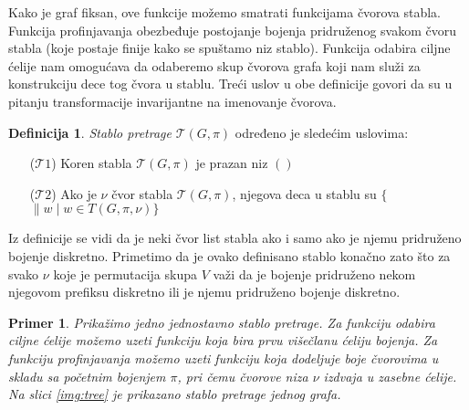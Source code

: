 \documentclass[12pt,oneside]{memoir}
\newtheorem{example}{Primer}
\theoremstyle{definition}
\newtheorem*{definition}{Definicija}
\begin{document}
  Kako je graf fiksan, ove funkcije možemo smatrati funkcijama čvorova stabla.
  Funkcija profinjavanja obezbeđuje postojanje bojenja pridruženog svakom čvoru
  stabla (koje postaje finije kako se spuštamo niz stablo). Funkcija odabira
  ciljne ćelije nam omogućava da odaberemo skup čvorova grafa koji nam služi za
  konstrukciju dece tog čvora u stablu. Treći uslov u obe definicije govori da
  su u pitanju transformacije invarijantne na imenovanje čvorova.

  \begin{definition}
      \emph{Stablo pretrage} $\mathcal{T}(G, \pi)$ određeno je sledećim uslovima:
  
   \begin{itemize}
       \item[($\mathcal{T}1$)] Koren stabla $\mathcal{T}(G, \pi)$ je prazan niz $()$
       \item[($\mathcal{T}2$)] Ako je $\nu$ čvor stabla $\mathcal{T}(G, \pi)$, njegova deca u
     	stablu su $\{$\nu$ \| w \mid w \in T(G, \pi, \nu)\}$
   \end{itemize}
  \end{definition}

  Iz definicije se vidi da je neki čvor list stabla ako i samo ako je njemu
  pridruženo bojenje diskretno. Primetimo da je ovako definisano stablo konačno
  zato što za svako $\nu$ koje je permutacija skupa $V$ važi da je bojenje
  pridruženo nekom njegovom prefiksu diskretno ili je njemu pridruženo bojenje
  diskretno.

  \begin{example}
	  Prikažimo jedno jednostavno stablo pretrage. Za funkciju odabira ciljne
	  ćelije možemo uzeti funkciju koja bira prvu višečlanu ćeliju bojenja.
	  Za funkciju profinjavanja možemo uzeti funkciju koja dodeljuje boje
	  čvorovima u skladu sa početnim bojenjem $\pi$, pri čemu čvorove niza
	  $\nu$ izdvaja u zasebne ćelije. Na slici \ref{img:tree} je prikazano
	  stablo pretrage jednog grafa.
  \end{example}
\end{document}
